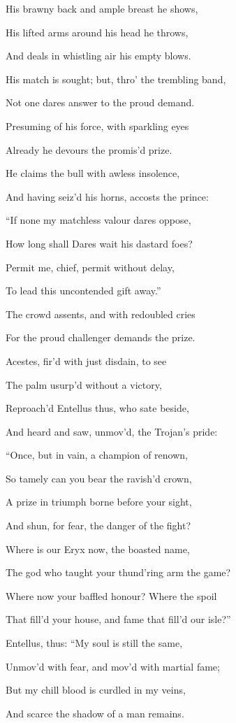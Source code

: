 His brawny back and ample breast he shows,

His lifted arms around his head he throws,

And deals in whistling air his empty blows.

His match is sought; but, thro’ the trembling band,

Not one dares answer to the proud demand.

Presuming of his force, with sparkling eyes

Already he devours the promis’d prize.

He claims the bull with awless insolence,

And having seiz’d his horns, accosts the prince:

“If none my matchless valour dares oppose,

How long shall Dares wait his dastard foes?

Permit me, chief, permit without delay,

To lead this uncontended gift away.”

The crowd assents, and with redoubled cries

For the proud challenger demands the prize.

Acestes, fir’d with just disdain, to see

The palm usurp’d without a victory,

Reproach’d Entellus thus, who sate beside,

And heard and saw, unmov’d, the Trojan’s pride:

“Once, but in vain, a champion of renown,

So tamely can you bear the ravish’d crown,

A prize in triumph borne before your sight,

And shun, for fear, the danger of the fight?

Where is our Eryx now, the boasted name,

The god who taught your thund’ring arm the game?

Where now your baffled honour? Where the spoil

That fill’d your house, and fame that fill’d our isle?”

Entellus, thus: “My soul is still the same,

Unmov’d with fear, and mov’d with martial fame;

But my chill blood is curdled in my veins,

And scarce the shadow of a man remains.

